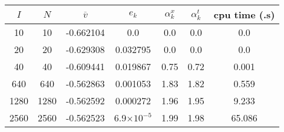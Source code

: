 \documentclass[a4paper,12pt, openright]{article}
\numberwithin{equation}{section}
\theoremstyle{definition}
\newcommand{\1}{\mathbbm{1}}
\begin{document}
    
    \begin{center}
        \begin{tabular}{|| c | c | c | c | c | c | c||}
        \hline 
        $I$ & $N$ & $\overline{v}$ & $e_k$ & $\alpha_k^x$ &  $\alpha_k^t$& cpu time (.s)\\
        \hline \hline
        10	&10	&-0.662104	&0.0	&0.0	&0.0	&0.0\\	
        20	&20	&-0.629308	&0.032795	&0.0	&0.0	&0.0\\	
        40	&40	&-0.609441	&0.019867	&0.75	&0.72	&0.001\\
        640	&640	&-0.562863	&0.001053	&1.83	&1.82 &0.559\\
        1280 &1280	&-0.562592	&0.000272	&1.96	&1.95	&9.233\\
        2560	&2560	&-0.562523	&6.9$\times 10^{-5}$	&1.99	&1.98	&65.086	\\

        \hline 
        \end{tabular}
    \label{tab3}
    \end{center}
    
    
\titleformat{\section}[display]{\color{db}\scshape\filcenter}{}{1em}{\hspace{-0.4pt} \Large\hspace{0.6em}}

   
\end{document}
